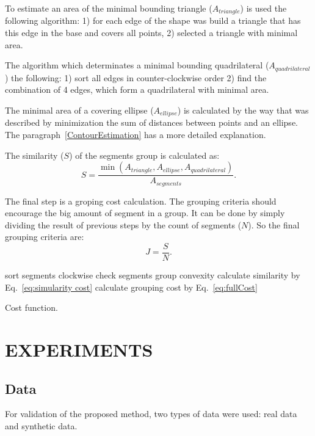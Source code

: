 \documentclass{lutmscthesis}[2010/09/22]
\begin{document}
To estimate an area of the minimal bounding triangle ($A_{triangle}$) is used the following algorithm: 1) for each edge of the shape was build a triangle that has this edge in the base and covers all points, 2) selected a triangle with minimal area.

The algorithm which determinates a minimal bounding quadrilateral ($A_{quadrilateral}$) the following: 1) sort all edges in counter-clockwise order 2) find the combination of 4 edges, which form a  quadrilateral with minimal area.

The minimal area of a covering ellipse ($A_{ellipse}$) is calculated by the way that was described by minimization the sum of distances between points and an ellipse. The paragraph~\ref{ContourEstimation} has a more detailed explanation.

The similarity ($S$) of the segments group is calculated as: 
\begin{equation}
    S = \frac{\min(A_{triangle},A_{ellipse},A_{quadrilateral})}{A_{segments}}.
    \label{eq:simularity cost}
\end{equation}

The final step is a groping cost calculation.  The grouping criteria should encourage the big amount of segment in a group. It can be done by simply dividing the result of previous steps by the count of segments ($N$). So the final grouping criteria are:
\begin{equation}
    J = \frac{S}{N}.
    \label{eq:fullCost}
\end{equation}



\begin{algorithm} [H]
    \SetAlgoLined
     {
     \Return {$\infty$ }
    }
    sort segments clockwise\;
    check segments group convexity\;
     {
        \Return {$\infty$ }
    }
    calculate similarity by Eq.~\ref{eq:simularity cost}\;
    calculate grouping cost by Eq.~\ref{eq:fullCost}\;
\caption{Cost function.}\label{alg:CostFunction}
\end{algorithm}

\section{EXPERIMENTS}
\label{sec:experiments}

\subsection{Data}
For validation of the proposed method, two types of data were used: real data and synthetic data.
 
\end{document}
